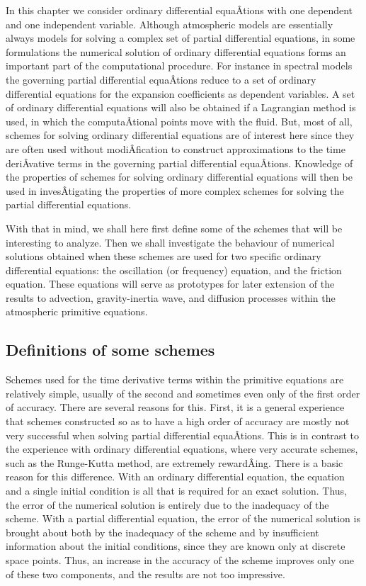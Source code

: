 In this chapter we consider ordinary differential equaÂ­tions with one
dependent and one independent variable. Although atmospheric models are
essentially always models for solving a complex set of partial
differential equations, in some formulations the numerical solution of
ordinary differential equations forms an important part of the
computational procedure. For instance in spectral models the governing
partial differential equaÂ­tions reduce to a set of ordinary differential
equations for the expansion coefficients as dependent variables. A set
of ordinary differential equations will also be obtained if a Lagrangian
method is used, in which the computaÂ­tional points move with the fluid.
But, most of all, schemes for solving ordinary differential equations
are of interest here since they are often used without modiÂ­fication to
construct approximations to the time deriÂ­vative terms in the governing
partial differential equaÂ­tions. Knowledge of the properties of schemes
for solving ordinary differential equations will then be used in
invesÂ­tigating the properties of more complex schemes for solving the
partial differential equations.

With that in mind, we shall here first define some of the schemes that
will be interesting to analyze. Then we shall investigate the behaviour
of numerical solutions obtained when these schemes are used for two
specific ordinary differential equations: the oscillation (or frequency)
equation, and the friction equation. These equations will serve as
prototypes for later extension of the results to advection,
gravity-inertia wave, and diffusion processes within the atmospheric
primitive equations.

\subsection{\texorpdfstring{\textbf{Definitions of some
schemes}}{Definitions of some schemes}}\label{Section2.1}

Schemes used for the time derivative terms within the primitive
equations are relatively simple, usually of the second and sometimes
even only of the first order of accuracy. There are several reasons for
this. First, it is a\textquotesingle{} general experience that schemes
constructed so as to have a high order of accuracy are mostly not very
successful when solving partial differential equaÂ­tions. This is in
contrast to the experience with ordinary differential equations, where
very accurate schemes, such as the Runge-Kutta method, are extremely
rewardÂ­ing. There is a basic reason for this difference. With an
ordinary differential equation, the equation and a single initial
condition is all that is required for an exact solution. Thus, the error
of the numerical solution is entirely due to the inadequacy of the
scheme. With a partial differential equation, the error of the numerical
solution is brought about both by the inadequacy of the scheme and by
insufficient information about the initial conditions, since they are
known only at discrete space points. Thus, an increase in the accuracy
of the scheme improves only one of these two components, and the results
are not too impressive.

